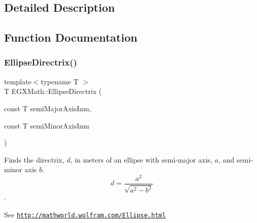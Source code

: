 \subsection{Detailed Description}


\subsection{Function Documentation}
\mbox{\label{group___e_g_x_math-_geometry-2_d-_ellipse-_directrix_gace8f72a8efbc9c18d3eb689151405106}} 
\subsubsection{\texorpdfstring{Ellipse\+Directrix()}{EllipseDirectrix()}}
{\footnotesize\ttfamily template$<$typename T $>$ \\
T E\+G\+X\+Math\+::\+Ellipse\+Directrix (\begin{DoxyParamCaption}\item[{const T}]{semi\+Major\+Axis\+Inm,  }\item[{const T}]{semi\+Minor\+Axis\+Inm }\end{DoxyParamCaption})}



Finds the directrix, $d$, in meters of an ellipse with semi-\/major axis, $a$, and semi-\/minor axis $b$. \[ d=\frac{a^2}{\sqrt{a^2-b^2}} \]. 

See \href{http://mathworld.wolfram.com/Ellipse.html}{\tt http\+://mathworld.\+wolfram.\+com/\+Ellipse.\+html}


